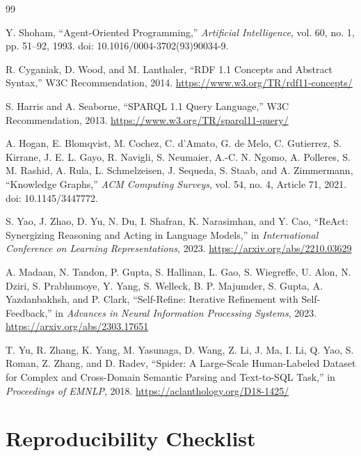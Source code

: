 \documentclass[11pt]{article}
\begin{document}
\begin{thebibliography}{99}

Y. Shoham,
``Agent-Oriented Programming,''
\emph{Artificial Intelligence}, vol. 60, no. 1, pp. 51--92, 1993.
doi: 10.1016/0004-3702(93)90034-9.

R. Cyganiak, D. Wood, and M. Lanthaler,
``RDF 1.1 Concepts and Abstract Syntax,''
W3C Recommendation, 2014.
\url{https://www.w3.org/TR/rdf11-concepts/}

S. Harris and A. Seaborne,
``SPARQL 1.1 Query Language,''
W3C Recommendation, 2013.
\url{https://www.w3.org/TR/sparql11-query/}

A. Hogan, E. Blomqvist, M. Cochez, C. d'Amato, G. de Melo, C. Gutierrez,
S. Kirrane, J. E. L. Gayo, R. Navigli, S. Neumaier, A.-C. N. Ngomo,
A. Polleres, S. M. Rashid, A. Rula, L. Schmelzeisen, J. Sequeda,
S. Staab, and A. Zimmermann,
``Knowledge Graphs,''
\emph{ACM Computing Surveys}, vol. 54, no. 4, Article 71, 2021.
doi: 10.1145/3447772.

S. Yao, J. Zhao, D. Yu, N. Du, I. Shafran, K. Narasimhan, and Y. Cao,
``ReAct: Synergizing Reasoning and Acting in Language Models,''
in \emph{International Conference on Learning Representations}, 2023.
\url{https://arxiv.org/abs/2210.03629}

A. Madaan, N. Tandon, P. Gupta, S. Hallinan, L. Gao, S. Wiegreffe,
U. Alon, N. Dziri, S. Prabhumoye, Y. Yang, S. Welleck, B. P. Majumder,
S. Gupta, A. Yazdanbakhsh, and P. Clark,
``Self-Refine: Iterative Refinement with Self-Feedback,''
in \emph{Advances in Neural Information Processing Systems}, 2023.
\url{https://arxiv.org/abs/2303.17651}

T. Yu, R. Zhang, K. Yang, M. Yasunaga, D. Wang, Z. Li, J. Ma,
I. Li, Q. Yao, S. Roman, Z. Zhang, and D. Radev,
``Spider: A Large-Scale Human-Labeled Dataset for Complex and Cross-Domain
Semantic Parsing and Text-to-SQL Task,''
in \emph{Proceedings of EMNLP}, 2018.
\url{https://aclanthology.org/D18-1425/}

\end{thebibliography}

\appendix

\section{Reproducibility Checklist}
\end{document}
